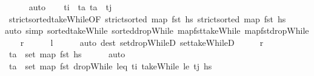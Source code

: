 \begin{isabellebody}
\ \ \ \ \isamarkupfalse%
\ auto\isanewline
\ \ \isamarkupfalse%
\ {\isachardoublequoteopen}{\isacharparenleft}{\kern0pt}t\isactrlsub i\ {\isacharless}{\kern0pt}\ t\isactrlsub a{\isacharparenright}{\kern0pt}{\isachardoublequoteclose}\ {\isachardoublequoteopen}t\isactrlsub a\ {\isacharless}{\kern0pt}\ t\isactrlsub j{\isachardoublequoteclose}\isanewline
\ \ \ \ \isamarkupfalse%
\ strict{\isacharunderscore}{\kern0pt}sorted{\isacharunderscore}{\kern0pt}takeWhile{\isacharbrackleft}{\kern0pt}OF\ {\isacartoucheopen}strict{\isacharunderscore}{\kern0pt}sorted\ {\isacharparenleft}{\kern0pt}map\ fst\ hs{\isacharparenright}{\kern0pt}{\isacartoucheclose}{\isacharbrackright}{\kern0pt}\ {\isacartoucheopen}strict{\isacharunderscore}{\kern0pt}sorted\ {\isacharparenleft}{\kern0pt}map\ fst\ hs{\isacharparenright}{\kern0pt}{\isacartoucheclose}\isanewline
\ \ \ \ \isamarkupfalse%
{\isacharparenleft}{\kern0pt}auto\ simp{\isacharcolon}{\kern0pt}\ sorted{\isacharunderscore}{\kern0pt}takeWhile\ sorted{\isacharunderscore}{\kern0pt}dropWhile\ map{\isacharunderscore}{\kern0pt}fst{\isacharunderscore}{\kern0pt}takeWhile\ map{\isacharunderscore}{\kern0pt}fst{\isacharunderscore}{\kern0pt}dropWhile{\isacharparenright}{\kern0pt}{\isacharplus}{\kern0pt}\isanewline
\ \ \isamarkupfalse%
\ {\isacharquery}{\kern0pt}r\isanewline
\ \ \ \ \isamarkupfalse%
\ {\isacartoucheopen}{\isacharquery}{\kern0pt}l{\isacartoucheclose}\isanewline
\ \ \ \ \isamarkupfalse%
\ {\isacharparenleft}{\kern0pt}auto\ dest{\isacharcolon}{\kern0pt}\ set{\isacharunderscore}{\kern0pt}dropWhileD\ set{\isacharunderscore}{\kern0pt}takeWhileD{\isacharparenright}{\kern0pt}\isanewline
{}\isamarkupfalse%
\ \isanewline
\ \ \isamarkupfalse%
\ {\isacharquery}{\kern0pt}r\isanewline
\ \ \isamarkupfalse%
\ {\isachardoublequoteopen}t\isactrlsub a\ {\isasymin}\ set\ {\isacharparenleft}{\kern0pt}map\ fst\ hs{\isacharparenright}{\kern0pt}{\isachardoublequoteclose}\isanewline
\ \ \ \ \isamarkupfalse%
\ auto\isanewline
\ \ \isamarkupfalse%
\ {\isachardoublequoteopen}t\isactrlsub a\ {\isasymin}\ set\ {\isacharparenleft}{\kern0pt}map\ fst\ {\isacharparenleft}{\kern0pt}{\isacharparenleft}{\kern0pt}dropWhile\ {\isacharparenleft}{\kern0pt}leq\ t\isactrlsub i{\isacharparenright}{\kern0pt}\ {\isacharparenleft}{\kern0pt}takeWhile\ {\isacharparenleft}{\kern0pt}le\ t\isactrlsub j{\isacharparenright}{\kern0pt}\ hs{\isacharparenright}{\kern0pt}{\isacharparenright}{\kern0pt}{\isacharparenright}{\kern0pt}{\isacharparenright}{\kern0pt}{\isachardoublequoteclose}\isanewline

\end{isabellebody}
